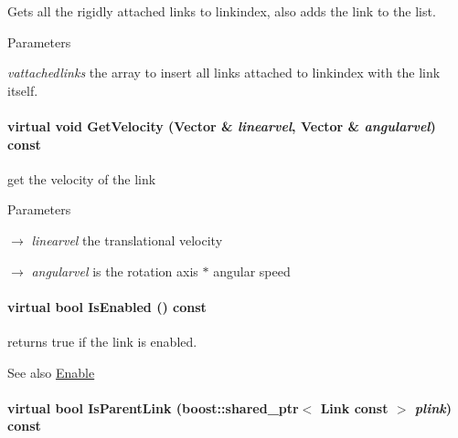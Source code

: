 Gets all the rigidly attached links to linkindex, also adds the link to the list. 


\begin{DoxyParams}{Parameters}
\item[{\em vattachedlinks}]the array to insert all links attached to linkindex with the link itself. \end{DoxyParams}
\hypertarget{classOpenRAVE_1_1KinBody_1_1Link_a9d1d9e28a3922fc0af0bf9e920e71257}{
\paragraph[{GetVelocity}]{\setlength{\rightskip}{0pt plus 5cm}virtual void GetVelocity (Vector \& {\em linearvel}, \/  Vector \& {\em angularvel}) const}\hfill}
\label{classOpenRAVE_1_1KinBody_1_1Link_a9d1d9e28a3922fc0af0bf9e920e71257}
get the velocity of the link 
\begin{DoxyParams}{Parameters}
\item[\mbox{$\rightarrow$} {\em linearvel}]the translational velocity \item[\mbox{$\rightarrow$} {\em angularvel}]is the rotation axis $\ast$ angular speed \end{DoxyParams}
\hypertarget{classOpenRAVE_1_1KinBody_1_1Link_ab093c91e2859f12d929fe8665e67a8e8}{
\paragraph[{IsEnabled}]{\setlength{\rightskip}{0pt plus 5cm}virtual bool IsEnabled () const}\hfill}
\label{classOpenRAVE_1_1KinBody_1_1Link_ab093c91e2859f12d929fe8665e67a8e8}


returns true if the link is enabled. 

\begin{DoxySeeAlso}{See also}
\hyperlink{classOpenRAVE_1_1KinBody_1_1Link_a93204280b89842474930316675ce9f07}{Enable} 
\end{DoxySeeAlso}
\hypertarget{classOpenRAVE_1_1KinBody_1_1Link_a5cda3b918d179bac6174b1114ba930fe}{
\paragraph[{IsParentLink}]{\setlength{\rightskip}{0pt plus 5cm}virtual bool IsParentLink (boost::shared\_\-ptr$<$ {\bf Link} const  $>$ {\em plink}) const}\hfill}
\label{classOpenRAVE_1_1KinBody_1_1Link_a5cda3b918d179bac6174b1114ba930fe}


